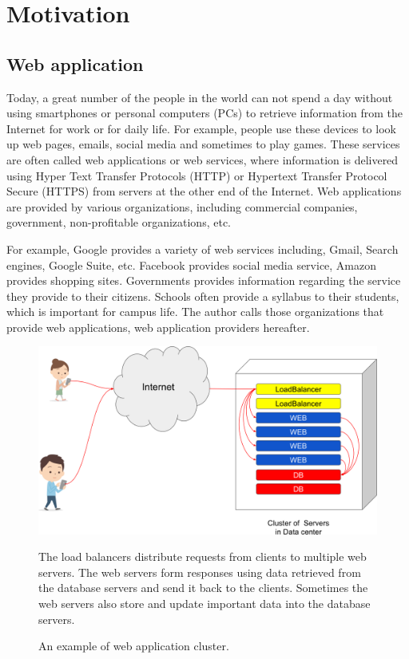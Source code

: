 
\section{Motivation}

\subsection{Web application}

Today, a great number of the people in the world can not spend a day without using smartphones or personal computers (PCs) to retrieve information from the Internet for work or for daily life.
For example, people use these devices to look up web pages, emails, social media and sometimes to play games.
These services are often called web applications or web services, where information is delivered using Hyper Text Transfer Protocols (HTTP) or Hypertext Transfer Protocol Secure (HTTPS) from servers at the other end of the Internet.
Web applications are provided by various organizations, including commercial companies, government, non-profitable organizations, etc.

For example, Google provides a variety of web services including, Gmail, Search engines, Google Suite, etc.
Facebook provides social media service, Amazon provides shopping sites.
Governments provides information regarding the service they provide to their citizens.
Schools often provide a syllabus to their students, which is important for campus life.
The author calls those organizations that provide web applications, web application providers hereafter.

\begin{figure}[h]
\begin{center}
\includegraphics[width=0.8\columnwidth]{Figs/web_cluster.png}
\end{center}
\caption{
An example of web application cluster.
}
\centering\parbox[c]{0.9\columnwidth}{
The load balancers distribute requests from clients to multiple web servers.
The web servers form responses using data retrieved from the database servers and send it back to the clients.
Sometimes the web servers also store and update important data into the database servers.
}
\label{fig:web_cluster}
\end{figure}

